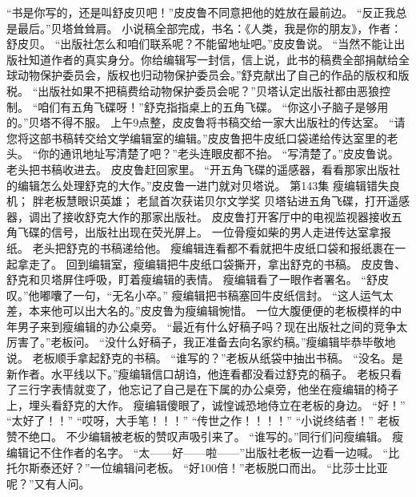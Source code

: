 \documentclass[a4paper,12pt,UTF8,twoside]{ctexbook}
\begin{document}
        “书是你写的，还是叫舒皮贝吧！”皮皮鲁不同意把他的姓放在最前边。 
        “反正我总是最后。”贝塔耸耸肩。 
        小说稿全部完成，书名：《人类，我是你的朋友》，作者：舒皮贝。 
        “出版社怎么和咱们联系呢？不能留地址吧。”皮皮鲁说。 
        “当然不能让出版社知道作者的真实身分。你给编辑写一封信，信上说，此书的稿费全部捐献给全球动物保护委员会，版权也归动物保护委员会。”舒克献出了自己的作品的版权和版税。 
        “出版社如果不把稿费给动物保护委员会呢？”贝塔认定出版社都由恶狼控制。 
        “咱们有五角飞碟呀！”舒克指指桌上的五角飞碟。 
        “你这小子脑子是够用的。”贝塔不得不服。 
        上午9点整，皮皮鲁将书稿交给一家大出版社的传达室。 
        “请您将这部书稿转交给文学编辑室的编辑。”皮皮鲁把牛皮纸口袋递给传达室里的老头。 
        “你的通讯地址写清楚了吧？”老头连眼皮都不抬。 
        “写清楚了。”皮皮鲁说。 
        老头把书稿收进去。 
        皮皮鲁赶回家里。 
        “开五角飞碟的遥感器，看看那家出版社的编辑怎么处理舒克的大作。”皮皮鲁一进门就对贝塔说。   第143集 
        瘦编辑错失良机； 
        胖老板慧眼识英雄； 
        老鼠首次获诺贝尔文学奖   
        贝塔钻进五角飞碟，打开遥感器，调出了接收舒克大作的那家出版社。 
        皮皮鲁打开客厅中的电视监视器接收五角飞碟的信号，出版社出现在荧光屏上。 
        一位骨瘦如柴的男人走进传达室拿报纸。 
        老头把舒克的书稿递给他。 
        瘦编辑连看都不看就把牛皮纸口袋和报纸裹在一起拿走了。 
        回到编辑室，瘦编辑把牛皮纸口袋撕开，拿出舒克的书稿。 
        皮皮鲁、舒克和贝塔屏住呼吸，盯着瘦编辑的表情。 
        瘦编辑看了一眼作者署名。 
        “舒皮叹。”他嘟囔了一句，“无名小卒。” 
        瘦编辑把书稿塞回牛皮纸信封。 
        “这人运气太差，本来他可以出大名的。”皮皮鲁为瘦编辑惋惜。 
        一位大腹便便的老板模样的中年男子来到瘦编辑的办公桌旁。 
        “最近有什么好稿子吗？现在出版社之间的竞争太厉害了。”老板问。 
        “没什么好稿子，我正准备去向名家约稿。”瘦编辑毕恭毕敬地说。 
        老板顺手拿起舒克的书稿。 
        “谁写的？”老板从纸袋中抽出书稿。 
        “没名。是新作者。水平线以下。”瘦编辑信口胡诌，他连看都没看过舒克的稿子。 
        老板只看了三行字表情就变了，他忘记了自己是在下属的办公桌旁，他坐在瘦编辑的椅子上，埋头看舒克的大作。 
        瘦编辑傻眼了，诚惶诚恐地侍立在老板的身边。 
        “好！” 
        “太好了！！” 
        “哎呀，大手笔！！！” 
        “传世之作！！！！” 
        “小说终结者！” 
        老板赞不绝口。 
        不少编辑被老板的赞叹声吸引来了。 
        “谁写的。”同行们问瘦编辑。 
        瘦编辑记不住作者的名字。 
        “太——好——啦——”出版社老板一边看一边喊。 
        “比托尔斯泰还好？”一位编辑问老板。 
        “好100倍！”老板脱口而出。 
        “比莎士比亚呢？”又有人问。 
\end{document}
